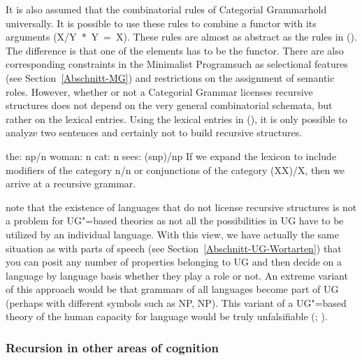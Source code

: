 It is also assumed that the combinatorial rules of Categorial Grammar\indexcg hold universally. It is possible to use these rules to
combine a functor with its arguments (\mbox{X/Y $*$ Y = X}). These rules are almost as abstract as the rules in (). The difference
is that one of the elements has to be the functor. There are also corresponding constraints in the Minimalist Program\indexmp such
as selectional features (see Section~\ref{Abschnitt-MG}) and restrictions on the assignment of
semantic roles. However, whether or not a Categorial Grammar licenses recursive structures does not depend on the very general combinatorial schemata, but rather on the lexical entries.
Using the lexical entries in (), it is only possible to analyze two sentences and certainly not to build recursive structures.

\eal
\ex the: np/n
\ex woman: n
\ex cat: n
\ex sees: (s\bs np)/np
\zl
If we expand the lexicon to include modifiers of the category n/n or conjunctions of the category (X\bs X)/X, then we arrive at a recursive
grammar.

\citet*[]{FHC2005a} note that the existence of languages that do not license recursive structures is not a problem for UG"=based theories
as not all the possibilities in UG have to be utilized by an individual language.
With this view, we have actually the same situation as with parts of speech (see
Section~\ref{Abschnitt-UG-Wortarten}) that you can posit any number of properties belonging to UG
and then decide on a language by language basis whether they play a role or not. An extreme variant of this approach would be that grammars of all languages become part of 
UG (perhaps with different symbols such as NP, NP). This variant of a UG"=based theory of the human capacity for language
would be truly unfalsifiable (\citealp[, 443]{EL2009a}; \citealp[]{Tomasello2009a}).

\subsubsection{Recursion in other areas of cognition}

